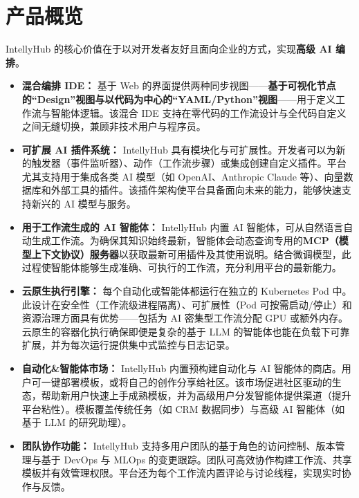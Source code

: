 \documentclass[11pt, a4paper, oneside]{article}
\begin{document}
\section{产品概览}
IntellyHub 的核心价值在于以对开发者友好且面向企业的方式，实现\textbf{高级 AI 编排}。
\begin{itemize}
    \item \textbf{混合编排 IDE：} 基于 Web 的界面提供两种同步视图——\textbf{基于可视化节点的“Design”视图与以代码为中心的“YAML/Python”视图}——用于定义工作流与智能体逻辑。该混合 IDE 支持在零代码的工作流设计与全代码自定义之间无缝切换，兼顾非技术用户与程序员。
    
    \item \textbf{可扩展 AI 插件系统：} IntellyHub 具有模块化与可扩展性。开发者可以为新的触发器（事件监听器）、动作（工作流步骤）或集成创建自定义插件。平台尤其支持用于集成各类 AI 模型（如 OpenAI、Anthropic Claude 等）、向量数据库和外部工具的插件。该插件架构使平台具备面向未来的能力，能够快速支持新兴的 AI 模型与服务。
    
    \item \textbf{用于工作流生成的 AI 智能体：} IntellyHub 内置 AI 智能体，可从自然语言自动生成工作流。为确保其知识始终最新，智能体会动态查询专用的\textbf{MCP（模型上下文协议）服务器}以获取最新可用插件及其使用说明。结合微调模型，此过程使智能体能够生成准确、可执行的工作流，充分利用平台的最新能力。
    
    \item \textbf{云原生执行引擎：} 每个自动化或智能体都运行在独立的 Kubernetes Pod 中。此设计在安全性（工作流级进程隔离）、可扩展性（Pod 可按需启动/停止）和资源治理方面具有优势——包括为 AI 密集型工作流分配 GPU 或额外内存。云原生的容器化执行确保即便是复杂的基于 LLM 的智能体也能在负载下可靠扩展，并为每次运行提供集中式监控与日志记录。
    
    \item \textbf{自动化\&智能体市场：} IntellyHub 内置预构建自动化与 AI 智能体的商店。用户可一键部署模板，或将自己的创作分享给社区。该市场促进社区驱动的生态，帮助新用户快速上手成熟模板，并为高级用户分发智能体提供渠道（提升平台粘性）。模板覆盖传统任务（如 CRM 数据同步）与高级 AI 智能体（如基于 LLM 的研究助理）。
    
    \item \textbf{团队协作功能：} IntellyHub 支持多用户团队的基于角色的访问控制、版本管理与基于 DevOps 与 MLOps 的变更跟踪。团队可高效协作构建工作流、共享模板并有效管理权限。平台还为每个工作流内置评论与讨论线程，实现实时协作与反馈。
\end{itemize}
\end{document}
